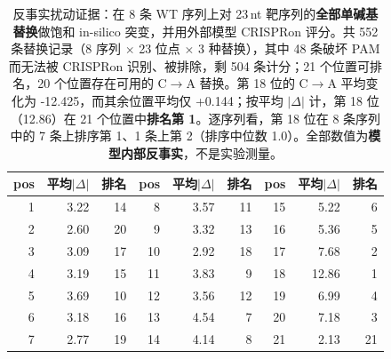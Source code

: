 \begin{table}[htbp]
\centering
\footnotesize
\caption{反事实扰动证据：在 8 条 WT 序列上对 23\,nt 靶序列的\textbf{全部单碱基替换}做饱和 in-silico 突变，并用外部模型 CRISPRon 评分。共 552 条替换记录（8 序列 $\times$ 23 位点 $\times$ 3 种替换），其中 48 条破坏 PAM 而无法被 CRISPRon 识别、被排除，剩 504 条计分；21 个位置可排名，20 个位置存在可用的 C$\rightarrow$A 替换。第 18 位的 C$\rightarrow$A 平均变化为 -12.425，而其余位置平均仅 +0.144；按平均 $|\Delta|$ 计，第 18 位（12.86）在 21 个位置中\textbf{排名第 1}。逐序列看，第 18 位在 8 条序列中的 7 条上排序第 1、1 条上第 2（排序中位数 1.0）。全部数值为\textbf{模型内部反事实}，不是实验测量。}
\label{tab:counterfactual}
\begin{tabular}{rrr@{\hspace{2em}}rrr@{\hspace{2em}}rrr}
\toprule
pos & 平均$|\Delta|$ & 排名 & pos & 平均$|\Delta|$ & 排名 & pos & 平均$|\Delta|$ & 排名 \\
\midrule
1 & 3.22 & 14 & 8 & 3.57 & 11 & 15 & 5.22 & 6 \\
2 & 2.60 & 20 & 9 & 3.32 & 13 & 16 & 5.36 & 5 \\
3 & 3.09 & 17 & 10 & 2.92 & 18 & 17 & 7.68 & 2 \\
4 & 3.19 & 15 & 11 & 3.83 & 9 & 18 & 12.86 & 1 \\
5 & 3.69 & 10 & 12 & 3.56 & 12 & 19 & 6.99 & 4 \\
6 & 3.18 & 16 & 13 & 4.54 & 7 & 20 & 7.18 & 3 \\
7 & 2.77 & 19 & 14 & 4.14 & 8 & 21 & 2.13 & 21 \\
\bottomrule
\end{tabular}
\end{table}

